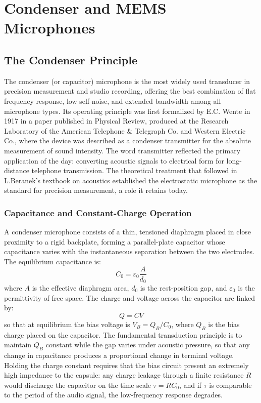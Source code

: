 
\graphicspath{{00_Images/12_chapter/}}

\chapter{Condenser and MEMS Microphones}
\label{ch:condenser_mems}

\section{The Condenser Principle}
\label{sc:121}

The condenser (or capacitor) microphone is the most widely used transducer in precision measurement and studio recording, offering the best combination of flat frequency response, low self-noise, and extended bandwidth among all microphone types.
Its operating principle was first formalized by E.C. Wente in 1917 in a paper published in Physical Review, produced at the Research Laboratory of the American Telephone \& Telegraph Co. and Western Electric Co., where the device was described as a condenser transmitter for the absolute measurement of sound intensity.
The word transmitter reflected the primary application of the day: converting acoustic signals to electrical form for long-distance telephone transmission.
The theoretical treatment that followed in L.Beranek's textbook on acoustics established the electrostatic microphone as the standard for precision measurement, a role it retains today.

\subsection{Capacitance and Constant-Charge Operation}

A condenser microphone consists of a thin, tensioned diaphragm placed in close proximity to a rigid backplate, forming a parallel-plate capacitor whose capacitance varies with the instantaneous separation between the two electrodes.
The equilibrium capacitance is:
\[
C_0 = \varepsilon_0 \frac{A}{d_0}
\]
where \( A \) is the effective diaphragm area, \( d_0 \) is the rest-position gap, and \( \varepsilon_0 \) is the permittivity of free space.
The charge and voltage across the capacitor are linked by:
\[
Q = CV
\]
so that at equilibrium the bias voltage is \( V_B = Q_B / C_0 \), where \( Q_B \) is the bias charge placed on the capacitor.
The fundamental transduction principle is to maintain \( Q_B \) constant while the gap varies under acoustic pressure, so that any change in capacitance produces a proportional change in terminal voltage.
Holding the charge constant requires that the bias circuit present an extremely high impedance to the capsule: any charge leakage through a finite resistance \( R \) would discharge the capacitor on the time scale \( \tau = RC_0 \), and if \( \tau \) is comparable to the period of the audio signal, the low-frequency response degrades.

